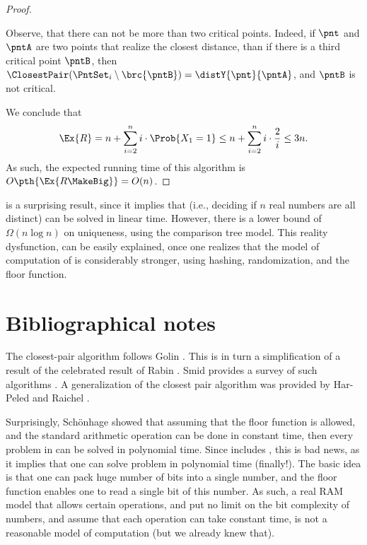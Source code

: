 \begin{proof}
\begin{compactenumA}
    \end{compactenumA}
    \smallskip%
    Observe, that there can not be more than two critical points.
    Indeed, if $\pnt$ and $\pntA$ are two points that realize the
    closest distance, than if there is a third critical point $\pntB$,
    then
    $\ClosestPair( \PntSet_i \setminus \brc{\pntB}) = \distY{\pnt}{
       \pntA}$, and $\pntB$ is not critical.

    We conclude that 
    \[
    \Ex{\bigl. R} = n + \sum_{i=2}^n i \cdot \Prob{X_1 = 1} \leq
    n + \sum_{i=2}^n i \cdot \frac{2}{i} \leq 3n. 
    \]
    As such, the expected running time of this algorithm is $O\pth{
    \Ex{R\MakeBig}} = O(n)$.
\end{proof}


 is a surprising result, since it implies that
 (i.e., deciding if $n$ real numbers are all
distinct) can be solved in linear time. However, there is a lower
bound of $\Omega(n \log n)$ on uniqueness, using the comparison tree
model. This reality dysfunction, can be easily explained, once one
realizes that the model of computation of  is
considerably stronger, using hashing, randomization, and the floor
function.



\section{Bibliographical notes}

The closest-pair algorithm follows Golin \etal{} \cite{grss-sracp-95}.
This is in turn a simplification of a result of the celebrated result
of Rabin \cite{r-pa-76}.  Smid provides a survey of such algorithms
\cite{s-cppcg-00}. A generalization of the closest pair algorithm was
provided by Har-Peled and Raichel \cite{hr-nplta-15}.

Surprisingly, Sch{\"{o}}\si{nhage} \cite{s-pram-79} showed that
assuming that the floor function is allowed, and the standard
arithmetic operation can be done in constant time, then every problem
in \PSPACE can be solved in polynomial time. Since \PSPACE includes
\NPC, this is bad news, as it implies that one can solve \NPC problem
in polynomial time (finally!). The basic idea is that one can pack
huge number of bits into a single number, and the floor function
enables one to read a single bit of this number. As such, a real RAM
model that allows certain operations, and put no limit on the bit
complexity of numbers, and assume that each operation can take
constant time, is not a reasonable model of computation (but we
already knew that).


\ChapterEnd{}
%  
%

%
